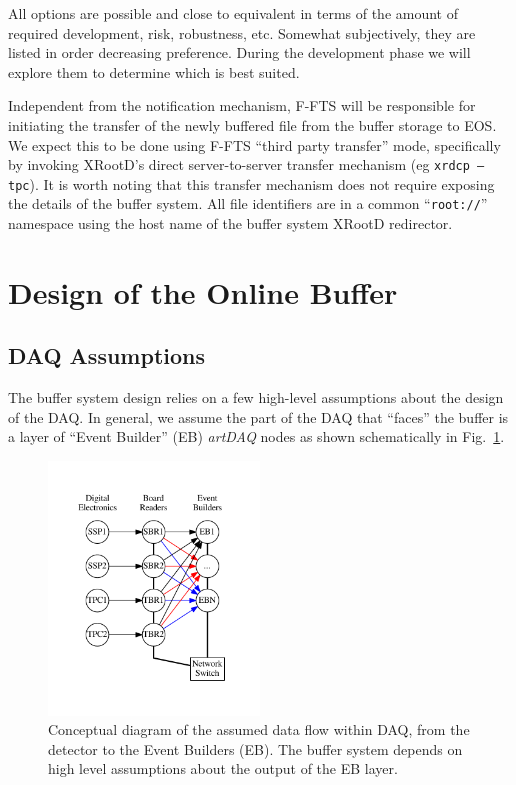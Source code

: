 \documentclass[pdftex,12pt,letter]{article}
\newcommand{\xrd}{XRootD\xspace}
\begin{document}
All options are possible and close to equivalent in terms of the
amount of required development, risk, robustness, etc.  Somewhat
subjectively, they are listed in order decreasing preference.  During
the development phase we will explore them to determine which is best
suited.

Independent from the notification mechanism, F-FTS will be responsible
for initiating the transfer of the newly buffered file from the buffer
storage to EOS.  We expect this to be done using F-FTS ``third party
transfer'' mode, specifically by invoking \xrd's direct
server-to-server transfer mechanism (eg \texttt{xrdcp --tpc}).  It is
worth noting that this transfer mechanism does not require exposing
the details of the buffer system.  All file identifiers are in a
common ``\texttt{root://}'' namespace using the host name of the
buffer system \xrd redirector.  

\section{Design of the Online Buffer}

\subsection{DAQ Assumptions}

The buffer system design relies on a few high-level assumptions about
the design of the DAQ.  In general, we assume the part of the DAQ that
``faces'' the buffer is a layer of ``Event Builder'' (EB) \textit{artDAQ}
nodes as shown schematically in Fig.~\ref{fig:upstream}.

\begin{figure}[tbh]
  \centering
  \includegraphics[width=0.5\textwidth]{../figures/upstream.pdf}
  \caption{Conceptual diagram of the assumed data flow within DAQ, from the detector to the Event Builders (EB).  The buffer system depends on high level assumptions about the output of the EB layer.}
  \label{fig:upstream}
\end{figure}
\end{document}
